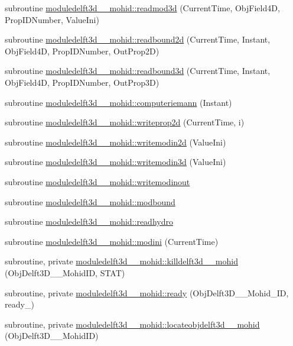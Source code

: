 \begin{DoxyCompactItemize}
\item 
subroutine \mbox{\hyperlink{namespacemoduledelft3d__2__mohid_aab6512966524b2869edb990481150929}{moduledelft3d\+\_\+\_\+mohid\+::readmod3d}} (Current\+Time, Obj\+Field4D, Prop\+I\+D\+Number, Value\+Ini)
\item 
subroutine \mbox{\hyperlink{namespacemoduledelft3d__2__mohid_ad65093a68569d902890feaaea9871be5}{moduledelft3d\+\_\+\_\+mohid\+::readbound2d}} (Current\+Time, Instant, Obj\+Field4D, Prop\+I\+D\+Number, Out\+Prop2D)
\item 
subroutine \mbox{\hyperlink{namespacemoduledelft3d__2__mohid_aae94fb67ed2e5ba83ca3fe0d12490cd4}{moduledelft3d\+\_\+\_\+mohid\+::readbound3d}} (Current\+Time, Instant, Obj\+Field4D, Prop\+I\+D\+Number, Out\+Prop3D)
\item 
subroutine \mbox{\hyperlink{namespacemoduledelft3d__2__mohid_a8f4d8b92955d25ef364cc44d4647b9c8}{moduledelft3d\+\_\+\_\+mohid\+::computeriemann}} (Instant)
\item 
subroutine \mbox{\hyperlink{namespacemoduledelft3d__2__mohid_a21830963ef76515bef7bb6ae8f5fb77b}{moduledelft3d\+\_\+\_\+mohid\+::writeprop2d}} (Current\+Time, i)
\item 
subroutine \mbox{\hyperlink{namespacemoduledelft3d__2__mohid_a80eedb762138913565ab5df14043c948}{moduledelft3d\+\_\+\_\+mohid\+::writemodin2d}} (Value\+Ini)
\item 
subroutine \mbox{\hyperlink{namespacemoduledelft3d__2__mohid_a5d66acc218cfe348245b89e3e6fac2f2}{moduledelft3d\+\_\+\_\+mohid\+::writemodin3d}} (Value\+Ini)
\item 
subroutine \mbox{\hyperlink{namespacemoduledelft3d__2__mohid_aec1314b8bd41c0bb55a2be43ece5267d}{moduledelft3d\+\_\+\_\+mohid\+::writemodinout}}
\item 
subroutine \mbox{\hyperlink{namespacemoduledelft3d__2__mohid_a3fc3c3a94f1ee827e72b2345af34c6b0}{moduledelft3d\+\_\+\_\+mohid\+::modbound}}
\item 
subroutine \mbox{\hyperlink{namespacemoduledelft3d__2__mohid_a04640ef3827cfdf73681b2b4ed0f3884}{moduledelft3d\+\_\+\_\+mohid\+::readhydro}}
\item 
subroutine \mbox{\hyperlink{namespacemoduledelft3d__2__mohid_ad00b6a867c663519cfa8ad6f6d2b3532}{moduledelft3d\+\_\+\_\+mohid\+::modini}} (Current\+Time)
\item 
subroutine, private \mbox{\hyperlink{namespacemoduledelft3d__2__mohid_a6a2192c5c8e2b5565ca4a3b91cd0ff48}{moduledelft3d\+\_\+\_\+mohid\+::killdelft3d\+\_\+\_\+mohid}} (Obj\+Delft3\+D\+\_\+\_\+\+Mohid\+ID, S\+T\+AT)
\item 
subroutine, private \mbox{\hyperlink{namespacemoduledelft3d__2__mohid_a6327ce6561d3a18563b847433529a19d}{moduledelft3d\+\_\+\_\+mohid\+::ready}} (Obj\+Delft3\+D\+\_\+\_\+\+Mohid\+\_\+\+ID, ready\+\_\+)
\item 
subroutine, private \mbox{\hyperlink{namespacemoduledelft3d__2__mohid_a0d0310530ae347fadb6afd0f39d0b3d2}{moduledelft3d\+\_\+\_\+mohid\+::locateobjdelft3d\+\_\+\_\+mohid}} (Obj\+Delft3\+D\+\_\+\_\+\+Mohid\+ID)
\end{DoxyCompactItemize}
